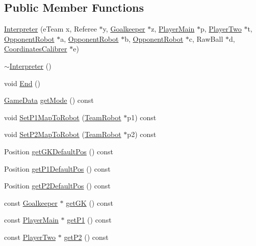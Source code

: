 \subsection*{Public Member Functions}
\begin{DoxyCompactItemize}
\item 
\hyperlink{classInterpreter_aa43e2d0df9f986ef4bde498aa8eadc04}{Interpreter} (eTeam x, Referee $\ast$y, \hyperlink{classGoalkeeper}{Goalkeeper} $\ast$z, \hyperlink{classPlayerMain}{PlayerMain} $\ast$p, \hyperlink{classPlayerTwo}{PlayerTwo} $\ast$t, \hyperlink{classOpponentRobot}{OpponentRobot} $\ast$a, \hyperlink{classOpponentRobot}{OpponentRobot} $\ast$b, \hyperlink{classOpponentRobot}{OpponentRobot} $\ast$c, RawBall $\ast$d, \hyperlink{classCoordinatesCalibrer}{CoordinatesCalibrer} $\ast$e)
\item 
\hyperlink{classInterpreter_a0f96b57f8126e2b5bc63390121e4b5b1}{$\sim$Interpreter} ()
\item 
void \hyperlink{classInterpreter_aa7c368c159002202e99b2c8b47acc534}{End} ()
\item 
\hyperlink{structInterpreter_1_1GameData}{GameData} \hyperlink{classInterpreter_adc77ada1a3d69c5e6bdfb2f1cc1a2e75}{getMode} () const 
\item 
void \hyperlink{classInterpreter_a4e5fcbc3020f3acd2d6855d12f8fe177}{SetP1MapToRobot} (\hyperlink{classTeamRobot}{TeamRobot} $\ast$p1) const 
\item 
void \hyperlink{classInterpreter_a3b96d97873572447193d3defe1bb877e}{SetP2MapToRobot} (\hyperlink{classTeamRobot}{TeamRobot} $\ast$p2) const 
\item 
Position \hyperlink{classInterpreter_aa8430187c89dffc8a9290d48ddd82346}{getGKDefaultPos} () const 
\item 
Position \hyperlink{classInterpreter_a2b46c460756f87d2dcef4ea8d8d49aaa}{getP1DefaultPos} () const 
\item 
Position \hyperlink{classInterpreter_ade297117d2ee20f524dd184ddd152c6d}{getP2DefaultPos} () const 
\item 
const \hyperlink{classGoalkeeper}{Goalkeeper} $\ast$ \hyperlink{classInterpreter_ac086d0ece936720419817ec19ebc3d8d}{getGK} () const 
\item 
const \hyperlink{classPlayerMain}{PlayerMain} $\ast$ \hyperlink{classInterpreter_af0d9f49ed686092925b626d032b0d9a6}{getP1} () const 
\item 
const \hyperlink{classPlayerTwo}{PlayerTwo} $\ast$ \hyperlink{classInterpreter_aa34b7799a25a0174b82690d09ce065f1}{getP2} () const 
\item 

\end{DoxyCompactItemize}
